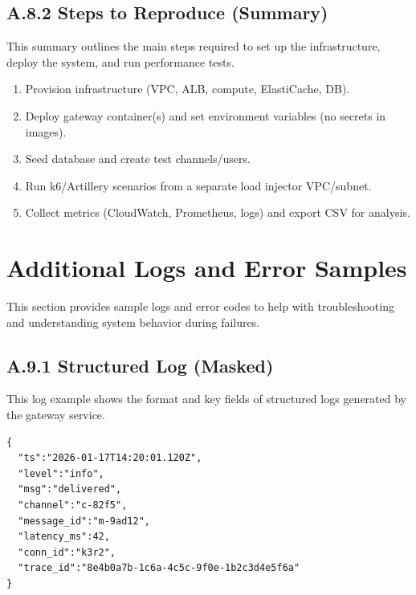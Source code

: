 \subsection*{A.8.2 Steps to Reproduce (Summary)}
This summary outlines the main steps required to set up the infrastructure, deploy the system, and run performance tests.
\begin{enumerate}
  \item Provision infrastructure (VPC, ALB, compute, ElastiCache, DB).
  \item Deploy gateway container(s) and set environment variables (no secrets in images).
  \item Seed database and create test channels/users.
  \item Run k6/Artillery scenarios from a separate load injector VPC/subnet.
  \item Collect metrics (CloudWatch, Prometheus, logs) and export CSV for analysis.
\end{enumerate}


\section{Additional Logs and Error Samples}
This section provides sample logs and error codes to help with troubleshooting and understanding system behavior during failures.
\label{app:logs}

\subsection*{A.9.1 Structured Log (Masked)}
This log example shows the format and key fields of structured logs generated by the gateway service.
\begin{lstlisting}[language={}, caption={Gateway structured log (JSON)}]
{
  "ts":"2026-01-17T14:20:01.120Z",
  "level":"info",
  "msg":"delivered",
  "channel":"c-82f5",
  "message_id":"m-9ad12",
  "latency_ms":42,
  "conn_id":"k3r2",
  "trace_id":"8e4b0a7b-1c6a-4c5c-9f0e-1b2c3d4e5f6a"
}
\end{lstlisting}

